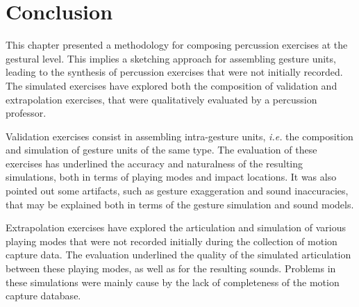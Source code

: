 	\section{Conclusion}
	\label{sec:Music_Conclusion}

This chapter presented a methodology for composing percussion exercises at the gestural level. This implies a sketching approach for assembling gesture units, leading to the synthesis of percussion exercises that were not initially recorded. The simulated exercises have explored both the composition of validation and extrapolation exercises, that were qualitatively evaluated by a percussion professor.

Validation exercises consist in assembling intra-gesture units, \emph{i.e.} the composition and simulation of gesture units of the same type. The evaluation of these exercises has underlined the accuracy and naturalness of the resulting simulations, both in terms of playing modes and impact locations. It was also pointed out some artifacts, such as gesture exaggeration and sound inaccuracies, that may be explained both in terms of the gesture simulation and sound models.

Extrapolation exercises have explored the articulation and simulation of various playing modes that were not recorded initially during the collection of motion capture data. The evaluation underlined the quality of the simulated articulation between these playing modes, as well as for the resulting sounds. Problems in these simulations were mainly cause by the lack of completeness of the motion capture database.


